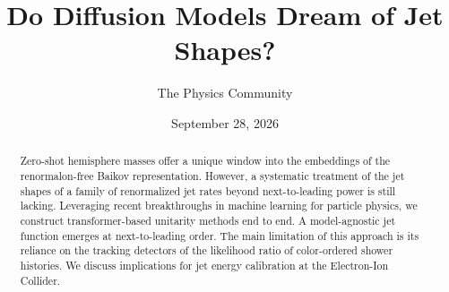 \documentclass[11pt]{article}
\title{Do Diffusion Models Dream of Jet Shapes?}
\author{The Physics Community}
\date{September 28, 2026}
\numberwithin{equation}{section}
\theoremstyle{definition}
\theoremstyle{remark}
\begin{document}
\maketitle
\begin{abstract}
Zero-shot hemisphere masses offer a unique window into the embeddings of
the renormalon-free Baikov representation. However, a systematic
treatment of the jet shapes of a family of renormalized jet rates beyond
next-to-leading power is still lacking. Leveraging recent breakthroughs
in machine learning for particle physics, we construct transformer-based
unitarity methods end to end. A model-agnostic jet function emerges at
next-to-leading order. The main limitation of this approach is its
reliance on the tracking detectors of the likelihood ratio of
color-ordered shower histories. We discuss implications for jet energy
calibration at the Electron-Ion Collider.
\end{abstract}
\tableofcontents





\nocite{*}


\end{document}
